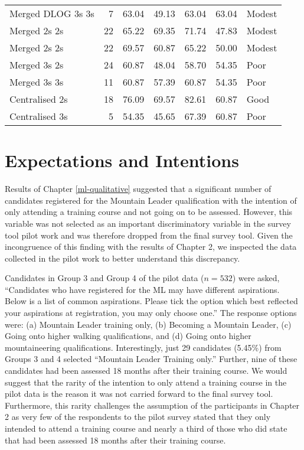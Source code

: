 \documentclass[
  12pt,
  a4paper,
]{book}
\begin{document}
\begin{table}[H]
\begin{tabular}[t]{lrrrrrl}
Merged DLOG 3s 3s & 7 & 63.04 & 49.13 & 63.04 & 63.04 & Modest\\
\rowcolor{gray!6}  Merged 2s 2s & 22 & 65.22 & 69.35 & 71.74 & 47.83 & Modest\\
Merged 2s 2s & 22 & 69.57 & 60.87 & 65.22 & 50.00 & Modest\\
\rowcolor{gray!6}  Merged 3s 2s & 24 & 60.87 & 48.04 & 58.70 & 54.35 & Poor\\
Merged 3s 3s & 11 & 60.87 & 57.39 & 60.87 & 54.35 & Poor\\
\rowcolor{gray!6}  Centralised 2s & 18 & 76.09 & 69.57 & 82.61 & 60.87 & Good\\
Centralised 3s & 5 & 54.35 & 45.65 & 67.39 & 60.87 & Poor\\
\bottomrule
\end{tabular}
\end{table}

\hypertarget{exp-int}{%
\chapter{Expectations and Intentions}\label{exp-int}}

Results of Chapter \ref{ml-qualitative} suggested that a significant number of candidates registered for the Mountain Leader qualification with the intention of only attending a training course and not going on to be assessed. However, this variable was not selected as an important discriminatory variable in the survey tool pilot work and was therefore dropped from the final survey tool. Given the incongruence of this finding with the results of Chapter 2, we inspected the data collected in the pilot work to better understand this discrepancy.

Candidates in Group 3 and Group 4 of the pilot data (\(n = 532\)) were asked, ``Candidates who have registered for the ML may have different aspirations. Below is a list of common aspirations. Please tick the option which best reflected your aspirations at registration, you may only choose one.'' The response options were: (a) Mountain Leader training only, (b) Becoming a Mountain Leader, (c) Going onto higher walking qualifications, and (d) Going onto higher mountaineering qualifications. Interestingly, just 29 candidates (5.45\%) from Groups 3 and 4 selected ``Mountain Leader Training only.'' Further, nine of these candidates had been assessed 18 months after their training course. We would suggest that the rarity of the intention to only attend a training course in the pilot data is the reason it was not carried forward to the final survey tool. Furthermore, this rarity challenges the assumption of the participants in Chapter 2 as very few of the respondents to the pilot survey stated that they only intended to attend a training course and nearly a third of those who did state that had been assessed 18 months after their training course.
\end{document}
